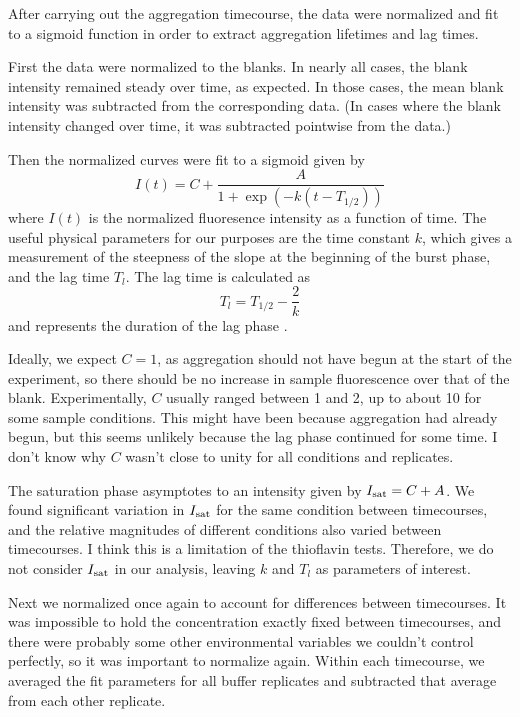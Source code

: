 After carrying out the aggregation timecourse, the data were normalized and fit to a sigmoid function in order to extract aggregation lifetimes and lag times.



First the data were normalized to the blanks.  In nearly all cases, the blank intensity remained steady over time, as expected.  In those cases, the mean blank intensity was subtracted from the corresponding data.  (In cases where the blank intensity changed over time, it was subtracted pointwise from the data.)

Then the normalized curves were fit to a sigmoid given by
\begin{equation}
I(t) = C + \frac{A}{1+\exp \left(-k(t-T_{1/2})\right)}
\label{eq:fit}
\end{equation}
where $I(t)$ is the normalized fluoresence intensity as a function of time.  The useful physical parameters for our purposes are the time constant $k$, which gives a measurement of the steepness of the slope at the beginning of the burst phase, and the lag time $T_l$.  The lag time is calculated as
\begin{equation}
T_l = T_{1/2} - \frac{2}{k}
\end{equation}
and represents the duration of the lag phase \cite{}.  

Ideally, we expect $C=1$, as aggregation should not have begun at the start of the experiment, so there should be no increase in sample fluorescence over that of the blank.  Experimentally, $C$ usually ranged between 1 and 2, up to about 10 for some sample conditions.  This might have been because aggregation had already begun, but this seems unlikely because the lag phase continued for some time.  I don't know why  $C$ wasn't close to unity for all conditions and replicates.

The saturation phase asymptotes to an intensity given by $I_{\mathrm{sat}}=C+A$.  We found significant variation in $I_{\mathrm{sat}}$ for the same condition between timecourses, and the relative magnitudes of different conditions also varied between timecourses.  I think this is a limitation of the thioflavin tests.  Therefore, we do not consider $I_{\mathrm{sat}}$ in our analysis, leaving $k$ and $T_l$ as parameters of interest.

Next we normalized once again to account for differences between timecourses.  It was impossible to hold the concentration exactly fixed between timecourses, and there were probably some other environmental variables we couldn't control perfectly, so it was important to normalize again.  Within each timecourse, we averaged the fit parameters for all buffer replicates and subtracted that average from each other replicate.
